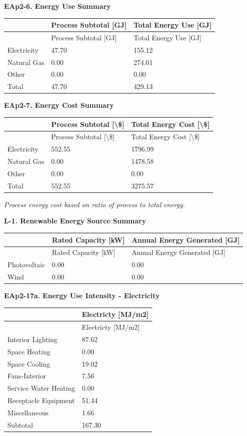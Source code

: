 \textbf{EAp2-6. Energy Use Summary}

\begin{longtable}[c]{@{}lll@{}}
\toprule
 & Process Subtotal [GJ] & Total Energy Use [GJ] \tabularnewline
\midrule
\endfirsthead

\toprule
 & Process Subtotal [GJ] & Total Energy Use [GJ] \tabularnewline
\midrule
\endhead

Electricity & 47.70 & 155.12 \tabularnewline
Natural Gas & 0.00 & 274.01 \tabularnewline
Other & 0.00 & 0.00 \tabularnewline
Total & 47.70 & 429.13 \tabularnewline
\bottomrule
\end{longtable}

\textbf{EAp2-7. Energy Cost Summary}

\begin{longtable}[c]{p{1.5in}p{2.21in}p{2.28in}}
\toprule
 & Process Subtotal [\textbackslash\$] & Total Energy Cost [\textbackslash\$] \tabularnewline
\midrule
\endfirsthead

\toprule
 & Process Subtotal [\textbackslash\$] & Total Energy Cost [\textbackslash\$] \tabularnewline
\midrule
\endhead

Electricity & 552.55 & 1796.99 \tabularnewline
Natural Gas & 0.00 & 1478.58 \tabularnewline
Other & 0.00 & 0.00 \tabularnewline
Total & 552.55 & 3275.57 \tabularnewline
\bottomrule
\end{longtable}

\emph{Process energy cost based on ratio of process to total energy.}

\textbf{L-1. Renewable Energy Source Summary}

\begin{longtable}[c]{@{}lll@{}}
\toprule
 & Rated Capacity [kW] & Annual Energy Generated [GJ] \tabularnewline
\midrule
\endfirsthead

\toprule
 & Rated Capacity [kW] & Annual Energy Generated [GJ] \tabularnewline
\midrule
\endhead

Photovoltaic & 0.00 & 0.00 \tabularnewline
Wind & 0.00 & 0.00 \tabularnewline
\bottomrule
\end{longtable}

\textbf{EAp2-17a. Energy Use Intensity - Electricity}

\begin{longtable}[c]{@{}ll@{}}
\toprule
 & Electricty [MJ/m2] \tabularnewline
\midrule
\endfirsthead

\toprule
 & Electricty [MJ/m2] \tabularnewline
\midrule
\endhead

Interior Lighting & 87.62 \tabularnewline
Space Heating & 0.00 \tabularnewline
Space Cooling & 19.02 \tabularnewline
Fans-Interior & 7.56 \tabularnewline
Service Water Heating & 0.00 \tabularnewline
Receptacle Equipment & 51.44 \tabularnewline
Miscellaneous & 1.66 \tabularnewline
Subtotal & 167.30 \tabularnewline
\bottomrule
\end{longtable}

